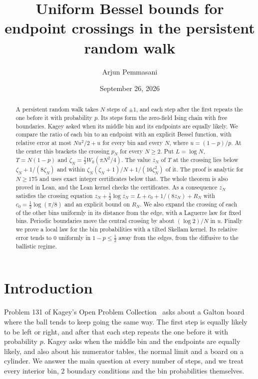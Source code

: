 \documentclass[11pt]{article}
\title{Uniform Bessel bounds for endpoint crossings
 in the persistent random walk}
\author{Arjun Pemmasani}
\date{September 26, 2026}
\theoremstyle{definition}
\theoremstyle{remark}
\begin{document}
\maketitle

\begin{abstract}
A persistent random walk takes $N$ steps of $\pm1$, and each step after the
first repeats the one before it with probability $p$. Its steps form the
zero-field Ising chain with free boundaries. Kagey asked when its middle bin
and its endpoints are equally likely. We compare the ratio of each bin to an
endpoint with an explicit Bessel function, with relative error at most
$Nu^2/2+u$ for every bin and every $N$, where $u=(1-p)/p$. At the center this
brackets the crossing $p_N$ for every $N\ge2$. Put $L=\log N$, $T=N(1-p)$ and
$\zeta_N=\frac12W_0(\pi N^2/4)$. The value $z_N$ of $T$ at the crossing lies
below $\zeta_N+1/(8\zeta_N)$ and within $\zeta_N(\zeta_N+1)/N+1/(16\zeta_N^2)$
of it. The proof is analytic for $N\ge175$ and uses exact integer
certificates below that. The whole theorem is also proved in Lean, and the
Lean kernel checks the certificates. As a consequence $z_N$ satisfies the
crossing equation $z_N+\frac12\log z_N=L+c_0+1/(8z_N)+R_N$ with
$c_0=\frac12\log(\pi/8)$ and an explicit bound on $R_N$. We also expand the
crossing of each of the other bins uniformly in its distance from the edge,
with a Laguerre law for fixed bins. Periodic boundaries move the central
crossing by about $(\log2)/N$ in $u$. Finally we prove a local law for the
bin probabilities with a tilted Skellam kernel. Its relative error tends to
$0$ uniformly in $1-p\le\frac12$ away from the edges, from the diffusive to
the ballistic regime.
\end{abstract}

\section{Introduction}\label{sec:intro}

Problem 131 of Kagey's Open Problem Collection~\cite{kagey131} asks about a
Galton board where the ball tends to keep going the same way. The first step
is equally likely to be left or right, and after that each step repeats the
one before it with probability $p$. Kagey asks when the middle bin and the
endpoints are equally likely, and also about his numerator tables, the normal
limit and a board on a cylinder. We answer the main question at every number
of steps, and we treat every interior bin, 2 boundary conditions and the bin
probabilities themselves.
\end{document}
